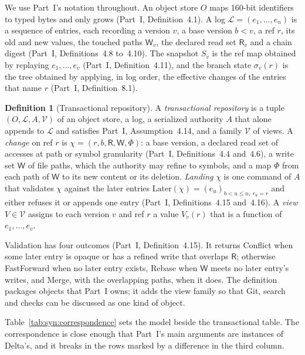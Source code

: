 \documentclass[11pt,letterpaper]{article}
\theoremstyle{definition}
\newtheorem{definition}[theorem]{Definition}
\theoremstyle{remark}
\newcommand{\R}{\mathsf{R}}
\newcommand{\W}{\mathsf{W}}
\newcommand{\Snap}[1]{S_{#1}}
\newcommand{\Log}{\mathcal{L}}
\newcommand{\Later}{\mathrm{Later}}
\begin{document}
We use Part~I's notation throughout. An object store $O$ maps 160-bit identifiers to typed bytes and only grows (Part~I, Definition~4.1). A log $\Log=(e_1,\dots,e_n)$ is a sequence of entries, each recording a version $v$, a base version $b<v$, a ref $r$, its old and new values, the touched paths $\W_v$, the declared read set $\R_v$ and a chain digest (Part~I, Definitions~4.8 to~4.10). The snapshot $\Snap{v}$ is the ref map obtained by replaying $e_1,\dots,e_v$ (Part~I, Definition~4.11), and the branch state $\sigma_v(r)$ is the tree obtained by applying, in log order, the effective changes of the entries that name $r$ (Part~I, Definition~8.1).

\begin{definition}[Transactional repository]
\label{def:syn:repo}
A \emph{transactional repository} is a tuple $(O,\Log,A,\mathcal{V})$ of an object store, a log, a serialized authority $A$ that alone appends to $\Log$ and satisfies Part~I, Assumption~4.14, and a family $\mathcal{V}$ of views. A \emph{change} on ref $r$ is $\chi=(r,b,\R,\W,\Phi)$: a base version, a declared read set of accesses at path or symbol granularity (Part~I, Definitions~4.4 and~4.6), a write set $\W$ of file paths, which the authority may refine to symbols, and a map $\Phi$ from each path of $\W$ to its new content or its deletion. \emph{Landing} $\chi$ is one command of $A$ that validates $\chi$ against the later entries $\Later(\chi)=(e_u)_{b<u\le n,\ r_u=r}$ and either refuses it or appends one entry (Part~I, Definitions~4.15 and~4.16). A \emph{view} $V\in\mathcal{V}$ assigns to each version $v$ and ref $r$ a value $V_v(r)$ that is a function of $e_1,\dots,e_v$.
\end{definition}

Validation has four outcomes (Part~I, Definition~4.15). It returns Conflict when some later entry is opaque or has a refined write that overlaps $\R$; otherwise FastForward when no later entry exists, Rebase when $\W$ meets no later entry's writes, and Merge, with the overlapping paths, when it does. The definition packages objects that Part~I owns; it adds the view family so that Git, search and checks can be discussed as one kind of object.

Table~\ref{tab:syn:correspondence} sets the model beside the transactional table. The correspondence is close enough that Part~I's main arguments are instances of Delta's, and it breaks in the rows marked by a difference in the third column.
\end{document}
